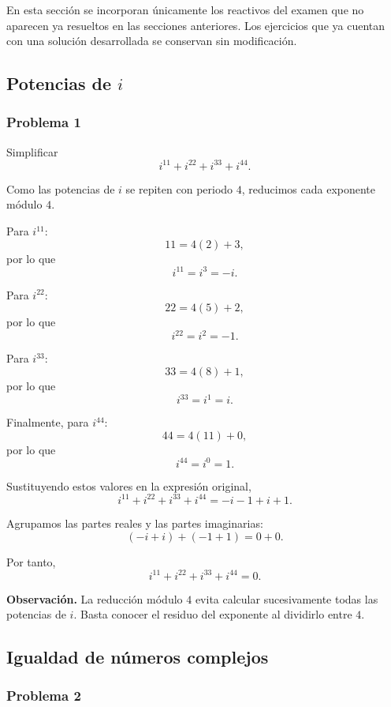 En esta sección se incorporan únicamente los reactivos del examen que no
aparecen ya resueltos en las secciones anteriores. Los ejercicios que ya
cuentan con una solución desarrollada se conservan sin modificación.

\subsection{Potencias de $i$}

\subsubsection*{Problema 1}

Simplificar
\[
i^{11}+i^{22}+i^{33}+i^{44}.
\]

Como las potencias de $i$ se repiten con periodo $4$, reducimos cada
exponente módulo $4$.

Para $i^{11}$:
\[
11=4(2)+3,
\]
por lo que
\[
i^{11}=i^3=-i.
\]

Para $i^{22}$:
\[
22=4(5)+2,
\]
por lo que
\[
i^{22}=i^2=-1.
\]

Para $i^{33}$:
\[
33=4(8)+1,
\]
por lo que
\[
i^{33}=i^1=i.
\]

Finalmente, para $i^{44}$:
\[
44=4(11)+0,
\]
por lo que
\[
i^{44}=i^0=1.
\]

Sustituyendo estos valores en la expresión original,
\[
i^{11}+i^{22}+i^{33}+i^{44}
=
-i-1+i+1.
\]

Agrupamos las partes reales y las partes imaginarias:
\[
(-i+i)+(-1+1)=0+0.
\]

Por tanto,
\[
\boxed{
i^{11}+i^{22}+i^{33}+i^{44}=0
}.
\]

\medskip

\noindent
\textbf{Observación.}
La reducción módulo $4$ evita calcular sucesivamente todas las potencias de
$i$. Basta conocer el residuo del exponente al dividirlo entre $4$.

\subsection{Igualdad de números complejos}

\subsubsection*{Problema 2}

